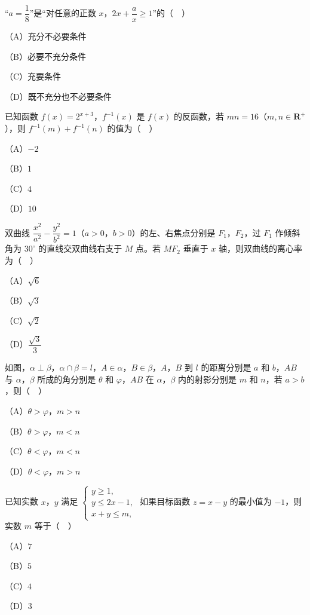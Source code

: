 \begin{question}
“$a=\dfrac18$”是“对任意的正数 $x$，$2x+\dfrac ax\geqslant1$”的（　）

（A）充分不必要条件

（B）必要不充分条件

（C）充要条件

（D）既不充分也不必要条件

\end{question}
\begin{question}
已知函数 $f(x)=2^{x+3}$，$f^{-1}(x)$ 是 $f(x)$ 的反函数，若 $mn=16$（$m,n\in\mathbf R^+$），则 $f^{-1}(m)+f^{-1}(n)$ 的值为（　）

（A）$-2$

（B）$1$

（C）$4$

（D）$10$

\end{question}
\begin{question}
双曲线 $\dfrac{x^2}{a^2}-\dfrac{y^2}{b^2}=1$（$a>0$，$b>0$）的左、右焦点分别是 $F_1$，$F_2$，过 $F_1$ 作倾斜角为 $30^\circ$ 的直线交双曲线右支于 $M$ 点。若 $MF_2$ 垂直于 $x$ 轴，则双曲线的离心率为（　）

（A）$\sqrt6$

（B）$\sqrt3$

（C）$\sqrt2$

（D）$\dfrac{\sqrt3}3$

\Needspace{0.4\textheight}
\end{question}
\begin{question}
如图，$\alpha\perp\beta$，$\alpha\cap\beta=l$，$A\in\alpha$，$B\in\beta$，$A$，$B$ 到 $l$ 的距离分别是 $a$ 和 $b$，$AB$ 与 $\alpha$，$\beta$ 所成的角分别是 $\theta$ 和 $\varphi$，$AB$ 在 $\alpha$，$\beta$ 内的射影分别是 $m$ 和 $n$，若 $a>b$，则（　）
\nopagebreak[4]
\begin{center}\end{center}
\nopagebreak[4]
（A）$\theta>\varphi$，$m>n$

（B）$\theta>\varphi$，$m<n$

（C）$\theta<\varphi$，$m<n$

（D）$\theta<\varphi$，$m>n$

\end{question}
\begin{question}
已知实数 $x$，$y$ 满足 $\begin{cases}y\geqslant1,\\ y\leqslant2x-1,\\ x+y\leqslant m,\end{cases}$ 如果目标函数 $z=x-y$ 的最小值为 $-1$，则实数 $m$ 等于（　）

（A）$7$

（B）$5$

（C）$4$

（D）$3$

\end{question}
